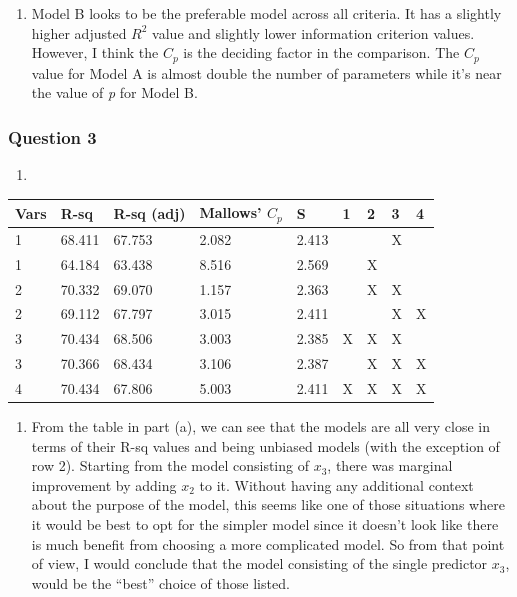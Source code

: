 \documentclass{article}
\providecommand{\tightlist}{%
      \setlength{\itemsep}{0pt}\setlength{\parskip}{0pt}}
\begin{document}
\begin{enumerate}
\def\labelenumi{\alph{enumi})}
\setcounter{enumi}{3}
\tightlist
\item
  Model B looks to be the preferable model across all criteria. It has a
  slightly higher adjusted \(R^2\) value and slightly lower information
  criterion values. However, I think the \(C_p\) is the deciding factor
  in the comparison. The \(C_p\) value for Model A is almost double the
  number of parameters while it's near the value of \emph{p} for Model
  B.
\end{enumerate}

\newpage
    \subsubsection{Question 3}\label{question-3}

\begin{enumerate}
\def\labelenumi{\alph{enumi})}
\item
\end{enumerate}

\begin{longtable}[c]{@{}lllllllll@{}}
\toprule
Vars & R-sq & R-sq (adj) & Mallows' \(C_p\) & S & 1 & 2 & 3 &
4\tabularnewline
\midrule
\endhead
1 & 68.411 & 67.753 & 2.082 & 2.413 & & & X &\tabularnewline
1 & 64.184 & 63.438 & 8.516 & 2.569 & & X & &\tabularnewline
2 & 70.332 & 69.070 & 1.157 & 2.363 & & X & X &\tabularnewline
2 & 69.112 & 67.797 & 3.015 & 2.411 & & & X & X\tabularnewline
3 & 70.434 & 68.506 & 3.003 & 2.385 & X & X & X &\tabularnewline
3 & 70.366 & 68.434 & 3.106 & 2.387 & & X & X & X\tabularnewline
4 & 70.434 & 67.806 & 5.003 & 2.411 & X & X & X & X\tabularnewline
\bottomrule
\end{longtable}

\begin{enumerate}
\def\labelenumi{\alph{enumi})}
\setcounter{enumi}{1}
\tightlist
\item
  From the table in part (a), we can see that the models are all very
  close in terms of their R-sq values and being unbiased models (with
  the exception of row 2). Starting from the model consisting of
  \(x_3\), there was marginal improvement by adding \(x_2\) to it.
  Without having any additional context about the purpose of the model,
  this seems like one of those situations where it would be best to opt
  for the simpler model since it doesn't look like there is much benefit
  from choosing a more complicated model. So from that point of view, I
  would conclude that the model consisting of the single predictor
  \(x_3\), would be the ``best'' choice of those listed.
\end{enumerate}


    
    
    
    
\end{document}

